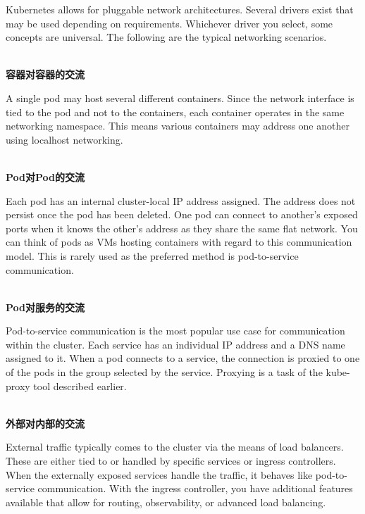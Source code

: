 
Kubernetes allows for pluggable network architectures. Several drivers exist that may be used depending on requirements. Whichever driver you select, some concepts are universal. The following are the typical networking scenarios.

\hspace*{\fill} \\ %
\noindent
\textbf{容器对容器的交流}

A single pod may host several different containers. Since the network interface is tied to the pod and not to the containers, each container operates in the same networking namespace. This means various containers may address one another using localhost networking.

\hspace*{\fill} \\ %
\noindent
\textbf{Pod对Pod的交流}

Each pod has an internal cluster-local IP address assigned. The address does not persist once the pod has been deleted. One pod can connect to another's exposed ports when it knows the other's address as they share the same flat network. You can think of pods as VMs hosting containers with regard to this communication model. This is rarely used as the preferred method is pod-to-service communication.

\hspace*{\fill} \\ %
\noindent
\textbf{Pod对服务的交流}

Pod-to-service communication is the most popular use case for communication within the cluster. Each service has an individual IP address and a DNS name assigned to it. When a pod connects to a service, the connection is proxied to one of the pods in the group selected by the service. Proxying is a task of the kube-proxy tool described earlier.

\hspace*{\fill} \\ %
\noindent
\textbf{外部对内部的交流}

External traffic typically comes to the cluster via the means of load balancers. These are either tied to or handled by specific services or ingress controllers. When the externally exposed services handle the traffic, it behaves like pod-to-service communication. With the ingress controller, you have additional features available that allow for routing, observability, or advanced load balancing.


